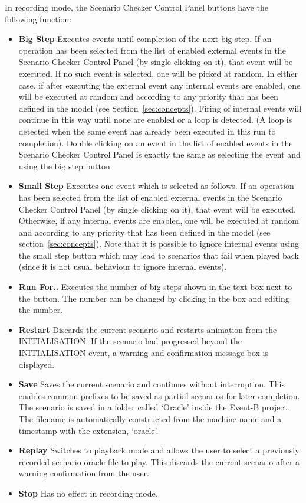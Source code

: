 In recording mode, the Scenario Checker Control Panel buttons have the following function:
\begin{itemize}
	\item \textbf{Big Step}  Executes events until completion of the next big step. If an operation has been selected from the list of enabled external events in the Scenario Checker Control Panel (by single clicking on it), that event will be executed. If no such event is selected, one will be picked at random. In either case, if after executing the external event any internal events are enabled, one will be executed at random and according to any priority that has been defined in the model (see Section~\ref{sec:concepts}). Firing of internal events will continue in this way until none are enabled or a loop is detected. (A loop is detected when the same event has already been executed in this run to completion). Double clicking on an event in the list of enabled events in the Scenario Checker Control Panel is exactly the same as selecting the event and using the big step button.
	\item \textbf{Small Step}  Executes one event which is selected as follows. If an operation has been selected from the list of enabled external events in the Scenario Checker Control Panel (by single clicking on it), that event will be executed. Otherwise, if any internal events are enabled, one will be executed at random and according to any priority that has been defined in the model (see section~\ref{sec:concepts}). Note that it is possible to ignore internal events using the small step button which may lead to scenarios that fail when played back (since it is not usual behaviour to ignore internal events).
	\item \textbf{Run For..}  Executes the number of big steps shown in the text box next to the button. The number can be changed by clicking in the box and editing the number.
	\item \textbf{Restart}  Discards the current scenario and restarts animation from the INITIALISATION. If the scenario had progressed beyond the INITIALISATION event, a warning and confirmation message box is displayed.
	\item \textbf{Save}  Saves the current scenario and continues without interruption. This enables common prefixes to be saved as partial scenarios for later completion. The scenario is saved in a folder called `Oracle' inside the Event-B project. The filename is automatically constructed from the machine name and a timestamp with the extension, `oracle'.
	\item \textbf{Replay}  Switches to playback mode and allows the user to select a previously recorded scenario oracle file to play. This discards the current scenario after a warning confirmation from the user.
	\item \textbf{Stop}  Has no effect in recording mode.
\end{itemize}

